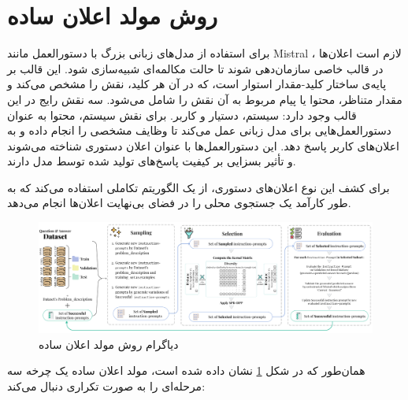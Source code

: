 \section{روش مولد اعلان ساده}

برای استفاده از مدل‌های زبانی بزرگ با دستورالعمل
 مانند Mistral \cite{mistral}، لازم است اعلان‌ها در قالب خاصی سازمان‌دهی شوند تا حالت مکالمه‌ای
  شبیه‌سازی شود.  
این قالب بر پایه‌ی ساختار کلید-مقدار
 استوار است، که در آن هر کلید، نقش
  را مشخص می‌کند و مقدار متناظر، محتوا یا پیام مربوط به آن نقش را شامل می‌شود. سه نقش رایج در این قالب وجود دارد: سیستم، دستیار و کاربر. برای نقش سیستم، محتوا به عنوان دستورالعمل‌هایی برای مدل زبانی عمل می‌کند تا وظایف مشخصی را انجام داده و به اعلان‌های کاربر پاسخ دهد.  
این دستورالعمل‌ها با عنوان اعلان دستوری
 شناخته می‌شوند و تأثیر بسزایی بر کیفیت پاسخ‌های تولید شده توسط مدل دارند.

برای کشف این نوع اعلان‌های دستوری، از یک الگوریتم تکاملی استفاده می‌کند که به طور کارآمد یک جستجوی محلی
 را در فضای بی‌نهایت اعلان‌ها انجام می‌دهد.  
 \begin{figure}[!t]
 	\centering
 	\includegraphics[width=140mm]{images/flow}
 	\caption{دیاگرام روش مولد اعلان ساده}
 	\label{fig_flowchart}
 \end{figure}

 
همان‌طور که در شکل \ref{fig_flowchart} نشان داده شده است، مولد اعلان ساده یک چرخه سه مرحله‌ای را به صورت تکراری دنبال می‌کند:

